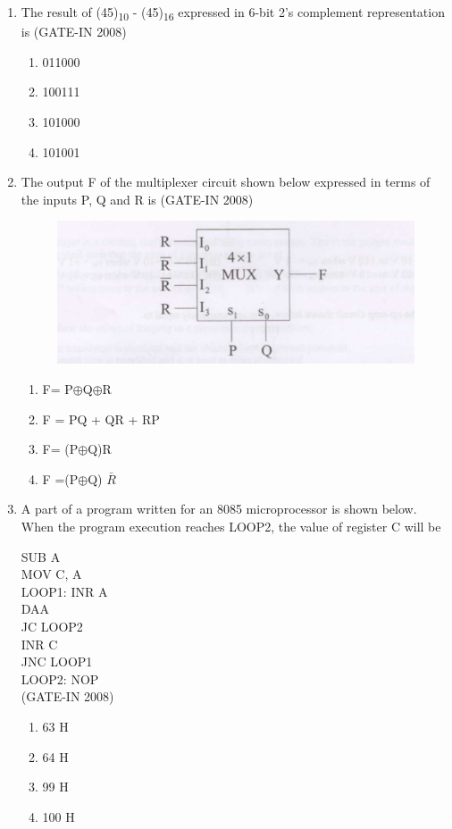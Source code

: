 \documentclass[journal,12pt,onecolumn]{IEEEtran}
\theoremstyle{remark}
\begin{document}
\begin{enumerate}
    \item The result of (45)\textsubscript{10} - (45)\textsubscript{16} expressed in 6-bit 2's complement representation is (GATE-IN 2008)
    \begin{multicols}{4}
    \begin{enumerate} 
        \item 011000
        \item 100111
        \item 101000
        \item 101001
    \end{enumerate}
    \end{multicols}
    
    \item  The output F of the multiplexer circuit shown below expressed in terms of the inputs P, Q and R is (GATE-IN 2008)
    \begin{figure}[H]
    \centering
    \includegraphics[width=0.5\columnwidth]{figs/i23.jpg}
    \caption{}
    \label{fig:placeholder23}
\end{figure}
\begin{multicols}{4}
    \begin{enumerate} 
        \item  F= P$\oplus$Q$\oplus$R
        \item  F = PQ + QR + RP
        \item  F= (P$\oplus$Q)R
        \item  F =(P$\oplus$Q) $\bar{R}$
    \end{enumerate}
    \end{multicols}
    
    \item A part of a program written for an 8085 microprocessor is shown below. When the program
execution reaches LOOP2, the value of register C will be

 SUB A\\ 
 MOV C, A  \\
 LOOP1: INR A\\  
    DAA  \\
    JC LOOP2\\  
    INR C  \\
    JNC LOOP1\\  
LOOP2: NOP\\
 (GATE-IN 2008)
 \begin{multicols}{4}
    \begin{enumerate} 
        \item 63 H
        \item 64 H
        \item 99 H
        \item 100 H
    \end{enumerate}
    \end{multicols}
    

\end{enumerate}
\end{document}
